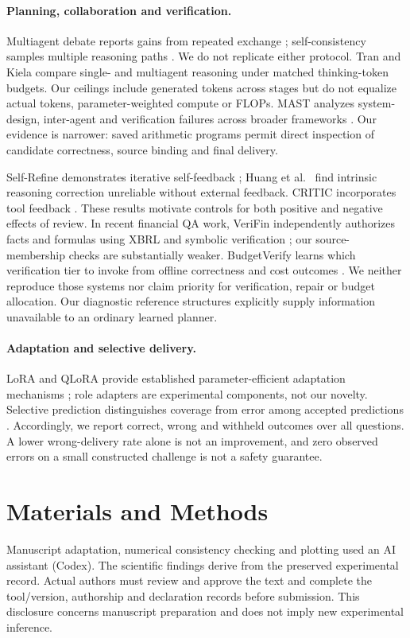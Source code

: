 \documentclass[computers,article,submit,moreauthors]{Definitions/mdpi}
\begin{document}
\paragraph{Planning, collaboration and verification.}
Multiagent debate reports gains from repeated exchange \citep{debate}; self-consistency samples multiple reasoning paths \citep{selfconsistency}. We do not replicate either protocol. Tran and Kiela \citep{equalbudget} compare single- and multiagent reasoning under matched thinking-token budgets. Our ceilings include generated tokens across stages but do not equalize actual tokens, parameter-weighted compute or FLOPs. MAST analyzes system-design, inter-agent and verification failures across broader frameworks \citep{mast}. Our evidence is narrower: saved arithmetic programs permit direct inspection of candidate correctness, source binding and final delivery.

Self-Refine demonstrates iterative self-feedback \citep{selfrefine}; Huang et al.\ \citep{selfcorrect} find intrinsic reasoning correction unreliable without external feedback. CRITIC incorporates tool feedback \citep{critic}. These results motivate controls for both positive and negative effects of review. In recent financial QA work, VeriFin independently authorizes facts and formulas using XBRL and symbolic verification \citep{verifin}; our source-membership checks are substantially weaker. BudgetVerify learns which verification tier to invoke from offline correctness and cost outcomes \citep{budgetverify}. We neither reproduce those systems nor claim priority for verification, repair or budget allocation. Our diagnostic reference structures explicitly supply information unavailable to an ordinary learned planner.

\paragraph{Adaptation and selective delivery.}
LoRA and QLoRA provide established parameter-efficient adaptation mechanisms \citep{lora,qlora}; role adapters are experimental components, not our novelty. Selective prediction distinguishes coverage from error among accepted predictions \citep{selective}. Accordingly, we report correct, wrong and withheld outcomes over all questions. A lower wrong-delivery rate alone is not an improvement, and zero observed errors on a small constructed challenge is not a safety guarantee.

\section{Materials and Methods}
Manuscript adaptation, numerical consistency checking and plotting used an AI assistant (Codex). The scientific findings derive from the preserved experimental record. Actual authors must review and approve the text and complete the tool/version, authorship and declaration records before submission. This disclosure concerns manuscript preparation and does not imply new experimental inference.
\end{document}
